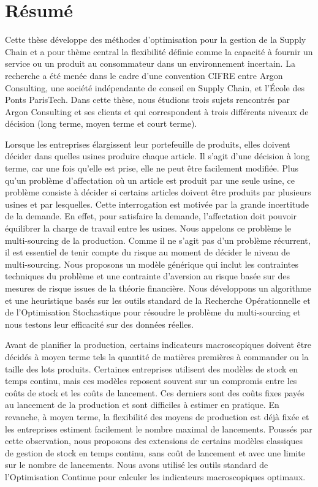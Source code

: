 \chapter*{R\'esum\'e} %
\label{cha:resume}


Cette thèse développe des méthodes d'optimisation pour la gestion de la Supply Chain et a pour thème central la flexibilité définie comme la capacité à fournir un service ou un produit au consommateur dans un environnement incertain.
La recherche a été menée dans le cadre d'une convention CIFRE entre Argon Consulting, une société indépendante de conseil en Supply Chain, et l'\'Ecole des Ponts ParisTech.
Dans cette thèse, nous étudions trois sujets rencontrés par Argon Consulting et ses clients et qui correspondent à trois différents niveaux de décision (long terme, moyen terme et court terme).


Lorsque les entreprises élargissent leur portefeuille de produits, elles doivent décider dans quelles usines produire chaque article.
Il s'agit d'une décision à long terme, car une fois qu'elle est prise, elle ne peut être facilement modifiée.
Plus qu'un problème d'affectation où un article est produit par une seule usine, ce problème consiste à décider si certains articles doivent être produits par plusieurs usines et par lesquelles.
Cette interrogation est motivée par la grande incertitude de la demande.
En effet, pour satisfaire la demande, l'affectation doit pouvoir équilibrer la charge de travail entre les usines.
Nous appelons ce problème le multi-sourcing de la production.
Comme il ne s'agit pas d'un problème récurrent, il est essentiel de tenir compte du risque au moment de décider le niveau de multi-sourcing.
Nous proposons un modèle générique qui inclut les contraintes techniques du problème et une contrainte d'aversion au risque basée sur des mesures de risque issues de la théorie financière.
Nous développons un algorithme et une heuristique basés sur les outils standard de la Recherche Opérationnelle et de l'Optimisation Stochastique pour résoudre le problème du multi-sourcing et nous testons leur efficacité sur des données réelles.


Avant de planifier la production, certains indicateurs macroscopiques doivent être décidés à moyen terme tels la quantité de matières premières à commander ou la taille des lots produits.
Certaines entreprises utilisent des modèles de stock en temps continu, mais ces modèles reposent souvent sur un compromis entre les coûts de stock et les coûts de lancement.
Ces derniers sont des coûts fixes payés au lancement de la production et sont difficiles à estimer en pratique.
En revanche, à moyen terme, la flexibilité des moyens de production est déjà fixée et les entreprises estiment facilement le nombre maximal de lancements.
Poussés par cette observation, nous proposons des extensions de certains modèles classiques de gestion de stock en temps continu, sans coût de lancement et avec une limite sur le nombre de lancements.
Nous avons utilisé les outils standard de l'Optimisation Continue pour calculer les indicateurs macroscopiques optimaux.


